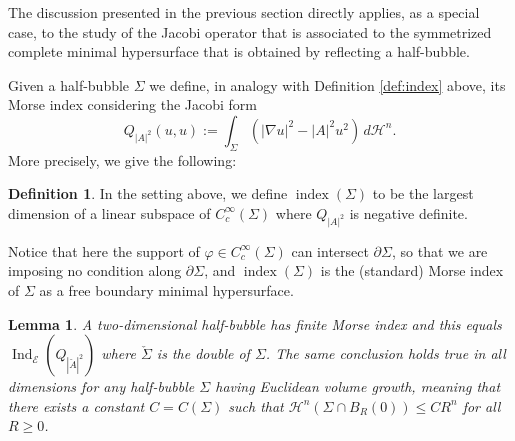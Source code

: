 \documentclass[10pt]{amsart}
\let\mathcal\mathscr
\newcounter{cas}
\DeclareMathOperator{\indx}{index}
\DeclareMathOperator{\Ind}{Ind}
\newtheorem{lem}[thm]{Lemma}
\theoremstyle{definition}
\newtheorem{definition}[thm]{Definition}
\newcommand{\h}{\mathscr{H}}
\begin{document}
The discussion presented in the previous section directly applies, as a special case, to the study of the Jacobi operator
that is associated to the symmetrized complete minimal hypersurface that is obtained by reflecting a half-bubble.

Given a half-bubble $\Sigma$ we define, in analogy with Definition \ref{def:index} above, its Morse index considering the Jacobi form
\[
Q_{|A|^2}(u,u):=\int_{\Sigma}(|\nabla u|^2-|A|^2u^2)\,d\h^n.
\]
More precisely, we give the following:

\begin{definition} In the setting above, we define
$\indx(\Sigma)$ to be the largest dimension of a linear subspace of $C^{\infty}_c(\Sigma)$ where $Q_{|A|^2}$ is negative definite.
\end{definition}
\noindent Notice that here the support of $\varphi\in C^{\infty}_c(\Sigma)$ can intersect $\partial\Sigma$, so that we are imposing no condition along $\partial\Sigma$, and $\indx(\Sigma)$ is the (standard) Morse index of $\Sigma$ as a free boundary minimal hypersurface.

\begin{lem}\label{lem:II1}
A two-dimensional half-bubble has finite Morse index and this equals $\Ind_{\mathcal{E}}(Q_{|\check{A}|^2})$ where $\check{\Sigma}$ is the double of $\Sigma$.
The same conclusion holds true in all dimensions for any half-bubble $\Sigma$ having Euclidean volume growth, meaning that there exists a constant $C=C(\Sigma)$ such that $\h^n(\Sigma\cap B_R(0))\leq C R^n$ for all $R\geq 0$.
\end{lem}
\end{document}
